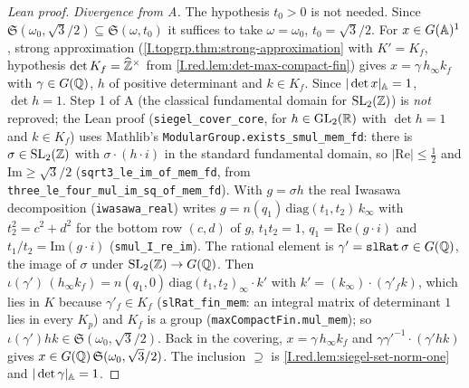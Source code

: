 \begin{proof}[Lean proof]
\emph{Divergence from A.} The hypothesis $t_0>0$ is not needed. Since $\mathfrak S(\omega_0,\sqrt3/2)\subseteq\mathfrak S(\omega,t_0)$ it suffices to take $\omega=\omega_0$, $t_0=\sqrt3/2$. For $x\in G(\mathbb{A})^1$, strong approximation (\cref{I.topgrp.thm:strong-approximation} with $K'=K_f$, hypothesis $\det K_f=\widehat{\mathbb{Z}}^\times$ from \cref{I.red.lem:det-max-compact-fin}) gives $x=\gamma\,h_\infty k_f$ with $\gamma\in G(\mathbb{Q})$, $h$ of positive determinant and $k\in K_f$. Since $|\det x|_{\mathbb{A}}=1$, $\det h=1$. Step 1 of A (the classical fundamental domain for $\mathrm{SL}_2(\mathbb{Z})$) is \emph{not} reproved; the Lean proof (\texttt{siegel\_cover\_core}, for $h\in\mathrm{GL}_2(\mathbb{R})$ with $\det h=1$ and $k\in K_f$) uses Mathlib's \texttt{ModularGroup.exists\_smul\_mem\_fd}: there is $\sigma\in\mathrm{SL}_2(\mathbb{Z})$ with $\sigma\cdot(h\cdot i)$ in the standard fundamental domain, so $|\mathrm{Re}|\le\tfrac12$ and $\mathrm{Im}\ge\sqrt3/2$ (\texttt{sqrt3\_le\_im\_of\_mem\_fd}, from \texttt{three\_le\_four\_mul\_im\_sq\_of\_mem\_fd}). With $g=\sigma h$ the real Iwasawa decomposition (\texttt{iwasawa\_real}) writes $g=n(q_1)\,\mathrm{diag}(t_1,t_2)\,k_\infty$ with $t_2^2=c^2+d^2$ for the bottom row $(c,d)$ of $g$, $t_1t_2=1$, $q_1=\mathrm{Re}(g\cdot i)$ and $t_1/t_2=\mathrm{Im}(g\cdot i)$ (\texttt{smul\_I\_re\_im}). The rational element is $\gamma'=\texttt{slRat}\,\sigma\in G(\mathbb{Q})$, the image of $\sigma$ under $\mathrm{SL}_2(\mathbb{Z})\to G(\mathbb{Q})$. Then $\iota(\gamma')\,(h_\infty k_f)=n(q_1,0)\,\mathrm{diag}(t_1,t_2)_\infty\cdot k'$ with $k'=(k_\infty)\cdot(\gamma'_f k)$, which lies in $K$ because $\gamma'_f\in K_f$ (\texttt{slRat\_fin\_mem}: an integral matrix of determinant $1$ lies in every $K_p$) and $K_f$ is a group (\texttt{maxCompactFin.mul\_mem}); so $\iota(\gamma')h k\in\mathfrak S(\omega_0,\sqrt3/2)$. Back in the covering, $x=\gamma\,h_\infty k_f$ and $\gamma\gamma'^{-1}\cdot(\gamma' h k)$ gives $x\in G(\mathbb{Q})\,\mathfrak S(\omega_0,\sqrt3/2)$. The inclusion $\supseteq$ is \cref{I.red.lem:siegel-set-norm-one} and $|\det\gamma|_{\mathbb{A}}=1$.
\end{proof}

